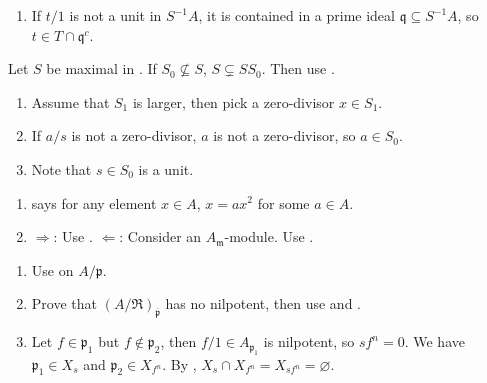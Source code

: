 \begin{exercise}\label{ex3.8}
	\begin{enumerate}
		\item[(v) $\Rightarrow$ (ii)] If $t/1$ is not a unit in $S^{-1}A$, it is contained in a prime ideal $\mathfrak{q}\subseteq S^{-1}A$, so $t\in T\cap\mathfrak{q}^c$.
	\end{enumerate}
\end{exercise}

\begin{exercise}\label{ex3.9}
	Let $S$ be maximal in . If $S_0\nsubseteq S$, $S\subsetneq SS_0$. Then use .
	\begin{enumerate}[label=(\roman*),ref=\theexercise(\roman*)]
		\item Assume that $S_1$ is larger, then pick a zero-divisor $x\in S_1$.
		\item If $a/s$ is not a zero-divisor, $a$ is not a zero-divisor, so $a\in S_0$.
		\item Note that $s\in S_0$ is a unit.
	\end{enumerate}
\end{exercise}

\begin{exercise}\label{ex3.10}
	\begin{enumerate}[label=(\roman*),ref=\theexercise(\roman*)]
		\item {} says for any element $x\in A$, $x=ax^2$ for some $a\in A$.
		\item $\Rightarrow$: Use . $\Leftarrow$: Consider an $A_\mathfrak{m}$-module. Use .
	\end{enumerate}
\end{exercise}

\begin{exercise}\label{ex3.11}
	\begin{enumerate}
		\item[(i) $\Rightarrow$ (ii)] Use  on $A/\mathfrak{p}$.
		\item[(ii) $\Rightarrow$ (i)] Prove that $\left(A/\mathfrak{R}\right)_{\overline{\mathfrak{p}}}$ has no nilpotent, then use  and .
		\item[(ii) $\Rightarrow$ (iv)] Let $f\in\mathfrak{p}_1$ but $f\notin\mathfrak{p}_2$, then $f/1\in A_{\mathfrak{p}_1}$ is nilpotent, so $sf^n=0$. We have $\mathfrak{p}_1\in X_s$ and $\mathfrak{p}_2\in X_{f^n}$. By , $X_s\cap X_{f^n}=X_{sf^n}=\varnothing$.
	\end{enumerate}
\end{exercise}


